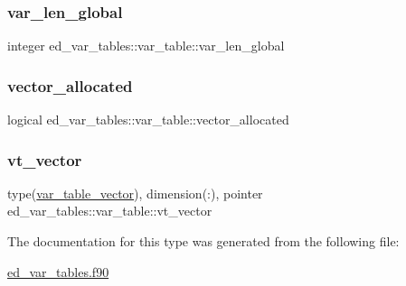 \subsubsection{\texorpdfstring{var\+\_\+len\+\_\+global}{var\_len\_global}}
{\footnotesize\ttfamily integer ed\+\_\+var\+\_\+tables\+::var\+\_\+table\+::var\+\_\+len\+\_\+global}

\mbox{\label{structed__var__tables_1_1var__table_a41255913720040623a6bf9dd5b8267c5}} 
\subsubsection{\texorpdfstring{vector\+\_\+allocated}{vector\_allocated}}
{\footnotesize\ttfamily logical ed\+\_\+var\+\_\+tables\+::var\+\_\+table\+::vector\+\_\+allocated}

\mbox{\label{structed__var__tables_1_1var__table_a3eacba058cb9fcc8bef162cbcfb0d106}} 
\subsubsection{\texorpdfstring{vt\+\_\+vector}{vt\_vector}}
{\footnotesize\ttfamily type(\hyperlink{structed__var__tables_1_1var__table__vector}{var\+\_\+table\+\_\+vector}), dimension(\+:), pointer ed\+\_\+var\+\_\+tables\+::var\+\_\+table\+::vt\+\_\+vector}



The documentation for this type was generated from the following file\+:\begin{DoxyCompactItemize}
\item 
\hyperlink{ed__var__tables_8f90}{ed\+\_\+var\+\_\+tables.\+f90}\end{DoxyCompactItemize}
